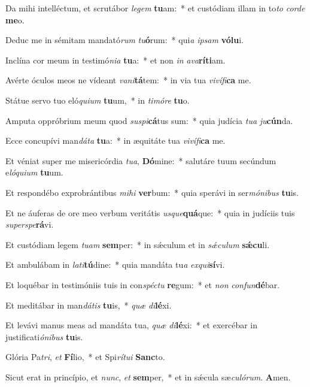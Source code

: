 ﻿\item Da mihi intelléctum, et scrutábor \emph{le}\emph{gem} \textbf{tu}am:~* et custódiam illam in to\emph{to} \emph{cor}\emph{de} \textbf{me}o.
\item Deduc me in sémitam mandató\emph{rum} \emph{tu}\textbf{ó}rum:~* qui\emph{a} \emph{ip}\emph{sam} \textbf{vó}\textbf{lu}i.
\item Inclína cor meum in testimó\emph{ni}\emph{a} \textbf{tu}a:~* et non \emph{in} \emph{a}\emph{va}\textbf{rí}\textbf{ti}am.
\item Avérte óculos meos ne vídeant \emph{va}\emph{ni}\textbf{tá}tem:~* in via tua \emph{vi}\emph{ví}\emph{fi}\textbf{ca} me.
\item Státue servo tuo eló\emph{qui}\emph{um} \textbf{tu}um,~* in \emph{ti}\emph{mó}\emph{re} \textbf{tu}o.
\item Amputa oppróbrium meum quod \emph{su}\emph{spi}\textbf{cá}tus sum:~* quia judícia \emph{tu}\emph{a} \emph{ju}\textbf{cún}da.
\item Ecce concupívi man\emph{dá}\emph{ta} \textbf{tu}a:~* in æquitáte tua \emph{vi}\emph{ví}\emph{fi}\textbf{ca} me.
\item Et véniat super me misericórdia \emph{tu}\emph{a}, \textbf{Dó}mine:~* salutáre tuum secúndum e\emph{ló}\emph{qui}\emph{um} \textbf{tu}um.
\item Et respondébo exprobrántibus \emph{mi}\emph{hi} \textbf{ver}bum:~* quia sperávi in ser\emph{mó}\emph{ni}\emph{bus} \textbf{tu}is.
\item Et ne áuferas de ore meo verbum veritátis \emph{us}\emph{que}\textbf{quá}que:~* quia in judíciis tuis \emph{su}\emph{per}\emph{spe}\textbf{rá}vi.
\item Et custódiam legem \emph{tu}\emph{am} \textbf{sem}per:~* in sǽculum et in \emph{sǽ}\emph{cu}\emph{lum} \textbf{sǽ}\textbf{cu}li.
\item Et ambulábam in \emph{la}\emph{ti}\textbf{tú}dine:~* quia mandáta tu\emph{a} \emph{ex}\emph{qui}\textbf{sí}vi.
\item Et loquébar in testimóniis tuis in con\emph{spéc}\emph{tu} \textbf{re}gum:~* et \emph{non} \emph{con}\emph{fun}\textbf{dé}bar.
\item Et meditábar in man\emph{dá}\emph{tis} \textbf{tu}is,~* \emph{quæ} \emph{di}\textbf{lé}xi.
\item Et levávi manus meas ad mandáta tua, \emph{quæ} \emph{di}\textbf{lé}xi:~* et exercébar in justificati\emph{ó}\emph{ni}\emph{bus} \textbf{tu}is.
\item Glória Pa\emph{tri}, \emph{et} \textbf{Fí}lio,~* et Spi\emph{rí}\emph{tu}\emph{i} \textbf{Sanc}to.
\item Sicut erat in princípio, et \emph{nunc}, \emph{et} \textbf{sem}per,~* et in sǽcula sæ\emph{cu}\emph{ló}\emph{rum}. \textbf{A}men.
